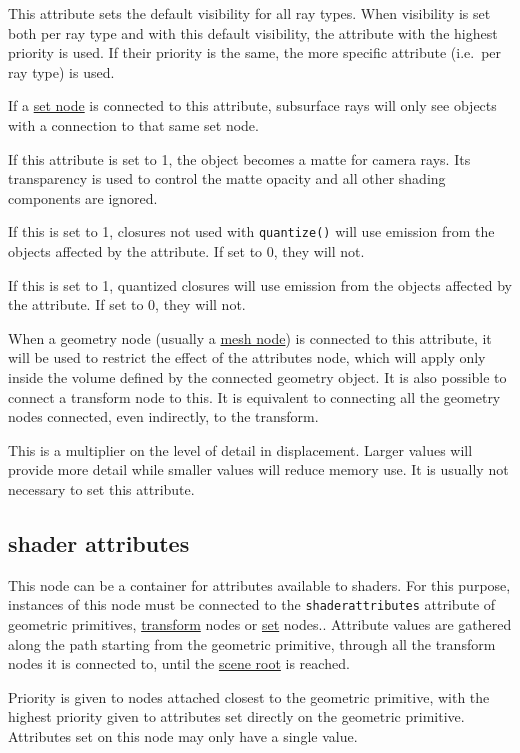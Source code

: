 \documentclass[oneside,ebook]{memoir}
\newcommand{\paramlistitemTN}[2]{\item[#2\textcolor{lightgray}{\dotfill}#1]}
\newcommand{\paramlistitemTND}[3]{\paramlistitemTN{#1 {\rmfamily({\ttfamily#3})}}{#2}}
\begin{document}
\begin{paramlist}
This attribute sets the default visibility for all ray types. When visibility is set both per ray type and with this default visibility, the attribute with the highest priority is used. If their priority is the same, the more specific attribute (i.e.\ per ray type) is used.
\paramlistitemTN{<connection>}{visibility.set.subsurface}
If a \hyperref[section:setnode]{set node} is connected to this attribute, subsurface rays will only see objects with a connection to that same set node.
\paramlistitemTND{int}{matte}{0}
If this attribute is set to 1, the object becomes a matte for camera rays. Its transparency is used to control the matte opacity and all other shading components are ignored.
\paramlistitemTND{int}{regularemission}{1}
If this is set to 1, closures not used with \lstinline|quantize()| will use emission from the objects affected by the attribute.
If set to 0, they will not.
\paramlistitemTND{int}{quantizedemission}{1}
If this is set to 1, quantized closures will use emission from the objects affected by the attribute.
If set to 0, they will not.
\paramlistitemTN{<connection>}{bounds}
When a geometry node (usually a \hyperref[section:meshnode]{mesh node}) is connected to this attribute, it will be used to restrict the effect of the attributes node, which will apply only inside the volume defined by the connected geometry object.
It is also possible to connect a transform node to this.
It is equivalent to connecting all the geometry nodes connected, even indirectly, to the transform.
\paramlistitemTND{float}{displacementresolution}{1}
This is a multiplier on the level of detail in displacement.
Larger values will provide more detail while smaller values will reduce memory use.
It is usually not necessary to set this attribute.
\end{paramlist}
\subsection{shader attributes}
This node can be a container for attributes available to shaders.
For this purpose, instances of this node must be connected to the \lstinline|shaderattributes| attribute of geometric primitives, \hyperref[section:transformnode]{transform} nodes or \hyperref[section:setnode]{set} nodes..
Attribute values are gathered along the path starting from the geometric primitive, through all the transform nodes it is connected to, until the \hyperref[section:rootnode]{scene root} is reached.

Priority is given to nodes attached closest to the geometric primitive, with the highest priority given to attributes set directly on the geometric primitive.
Attributes set on this node may only have a single value.
\end{document}
